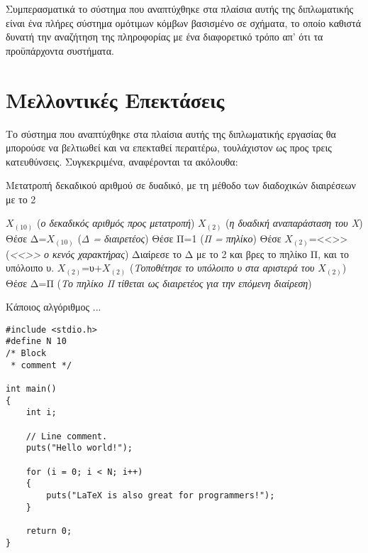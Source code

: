 Συμπερασματικά το σύστημα που αναπτύχθηκε στα πλαίσια αυτής της
διπλωματικής είναι ένα πλήρες σύστημα ομότιμων κόμβων βασισμένο σε
σχήματα, το οποίο καθιστά δυνατή την αναζήτηση της πληροφορίας με
ένα διαφορετικό τρόπο απ' ότι τα προϋπάρχοντα  συστήματα.

\section{Μελλοντικές Επεκτάσεις}
Το σύστημα που αναπτύχθηκε στα πλαίσια αυτής της διπλωματικής
εργασίας θα μπορούσε να βελτιωθεί και να επεκταθεί περαιτέρω,
τουλάχιστον ως προς τρεις κατευθύνσεις. Συγκεκριμένα, αναφέρονται
τα ακόλουθα:

%
\begin{algorithm}[tb]
  \caption{Μετατροπή δεκαδικού αριθμού σε δυαδικό, με τη μέθοδο των διαδοχικών διαιρέσεων με το 2}
  \label{decimal2binary1}
	\begin{algorithmic}
		\Require $X_{(10)}$ \small (\emph{ο δεκαδικός αριθμός προς μετατροπή}) \normalsize
		\Ensure $X_{(2)}$ \small (\emph{η δυαδική αναπαράσταση του Χ}) \normalsize
		\State Θέσε Δ=$X_{(10)}$ \small (\emph{Δ = διαιρετέος}) \normalsize
		\State Θέσε Π=1 \small (\emph{Π = πηλίκο}) \normalsize
		\State Θέσε $X_{(2)}$=<<>> \small (\emph{<<>> ο κενός χαρακτήρας}) \normalsize
			\State Διαίρεσε το Δ με το 2 και βρες το πηλίκο Π, και το υπόλοιπο υ.
			\State $X_{(2)}$=υ+$X_{(2)}$ \small (\emph{Τοποθέτησε το υπόλοιπο υ στα αριστερά του $X_{(2)}$}) \normalsize
			\State Θέσε Δ=Π \small (\emph{Το πηλίκο Π τίθεται ως διαιρετέος για την επόμενη διαίρεση}) \normalsize
		\EndWhile
	\end{algorithmic}
\end{algorithm}
%

%
\begin{algorithm}[tb]
  \caption{Κάποιος αλγόριθμος ...}
  \label{some_algorithm}
  \lstset{language=C}
  \begin{lstlisting}
#include <stdio.h>
#define N 10
/* Block
 * comment */
 
int main()
{
    int i;
 
    // Line comment.
    puts("Hello world!");
 
    for (i = 0; i < N; i++)
    {
        puts("LaTeX is also great for programmers!");
    }
 
    return 0;
}
  \end{lstlisting}
\end{algorithm}
%

